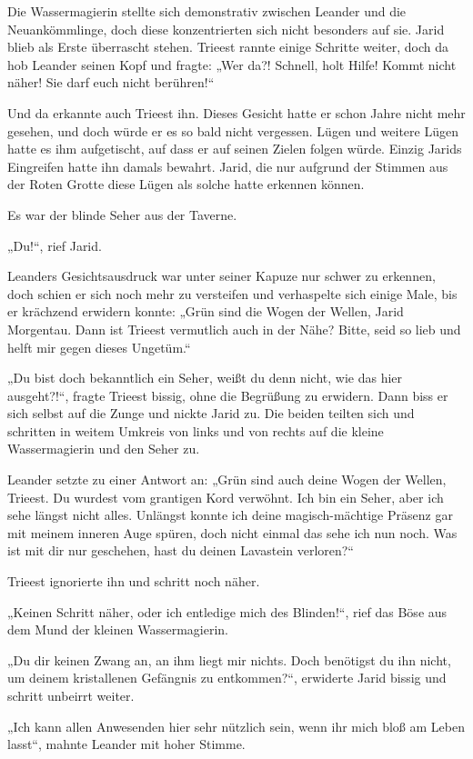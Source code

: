 Die Wassermagierin stellte sich demonstrativ zwischen Leander und die Neuankömmlinge, doch diese konzentrierten sich nicht besonders auf sie. Jarid blieb als Erste überrascht stehen. Trieest rannte einige Schritte weiter, doch da hob Leander seinen Kopf und fragte: „Wer da?! Schnell, holt Hilfe! Kommt nicht näher! Sie darf euch nicht berühren!“

Und da erkannte auch Trieest ihn. Dieses Gesicht hatte er schon Jahre nicht mehr gesehen, und doch würde er es so bald nicht vergessen. Lügen und weitere Lügen hatte es ihm aufgetischt, auf dass er auf seinen Zielen folgen würde. Einzig Jarids Eingreifen hatte ihn damals bewahrt. Jarid, die nur aufgrund der Stimmen aus der Roten Grotte diese Lügen als solche hatte erkennen können.

Es war der blinde Seher aus der Taverne.

„Du!“, rief Jarid.

Leanders Gesichtsausdruck war unter seiner Kapuze nur schwer zu erkennen, doch schien er sich noch mehr zu versteifen und verhaspelte sich einige Male, bis er krächzend erwidern konnte: „Grün sind die Wogen der Wellen, Jarid Morgentau. Dann ist Trieest vermutlich auch in der Nähe? Bitte, seid so lieb und helft mir gegen dieses Ungetüm.“

„Du bist doch bekanntlich ein Seher, weißt du denn nicht, wie das hier ausgeht?!“, fragte Trieest bissig, ohne die Begrüßung zu erwidern. Dann biss er sich selbst auf die Zunge und nickte Jarid zu. Die beiden teilten sich und schritten in weitem Umkreis von links und von rechts auf die kleine Wassermagierin und den Seher zu.

Leander setzte zu einer Antwort an: „Grün sind auch deine Wogen der Wellen, Trieest. Du wurdest vom grantigen Kord verwöhnt. Ich bin ein Seher, aber ich sehe längst nicht alles. Unlängst konnte ich deine magisch-mächtige Präsenz gar mit meinem inneren Auge spüren, doch nicht einmal das sehe ich nun noch. Was ist mit dir nur geschehen, hast du deinen Lavastein verloren?“

Trieest ignorierte ihn und schritt noch näher.

„Keinen Schritt näher, oder ich entledige mich des Blinden!“, rief das Böse aus dem Mund der kleinen Wassermagierin.

„Du dir keinen Zwang an, an ihm liegt mir nichts. Doch benötigst du ihn nicht, um deinem kristallenen Gefängnis zu entkommen?“, erwiderte Jarid bissig und schritt unbeirrt weiter.

„Ich kann allen Anwesenden hier sehr nützlich sein, wenn ihr mich bloß am Leben lasst“, mahnte Leander mit hoher Stimme.

